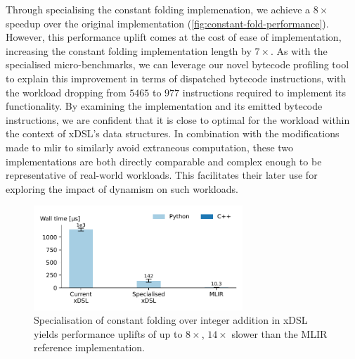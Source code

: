 Through specialising the constant folding implemenation, we achieve a $8\times$ speedup over the original implementation (\autoref{fig:constant-fold-performance}).
However, this performance uplift comes at the cost of ease of implementation, increasing the constant folding implementation length by $7\times$.
As with the specialised micro-benchmarks, we can leverage our novel bytecode profiling tool to explain this improvement in terms of dispatched bytecode instructions, with the workload dropping from $5465$ to $977$ instructions required to implement its functionality.
By examining the implementation and its emitted bytecode instructions, we are confident that it is close to optimal for the workload within the context of xDSL's data structures.
In combination with the modifications made to \ac{mlir} to similarly avoid extraneous computation, these two implementations are both directly comparable and complex enough to be representative of real-world workloads.
This facilitates their later use for exploring the impact of dynamism on such workloads.


\begin{figure}[H]
    \centering
    \includegraphics[width=0.7\textwidth]{images/specialising_optimising_xdsl_rewriting/constant_performance.pdf}
    \caption{Specialisation of constant folding over integer addition in xDSL yields performance uplifts of
up to $8\times$, $14\times$ slower than the MLIR reference
implementation.}
    \label{fig:constant-fold-performance}
\end{figure}

